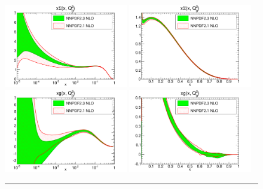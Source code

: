 \begin{figure}[hp!]
\centering
\includegraphics[width=0.48\textwidth]{6-LHCimpact/figs/xSinglet_Q_2_log-21-vs-23-nlo.pdf}
\includegraphics[width=0.48\textwidth]{6-LHCimpact/figs/xSinglet_Q_2_lin-21-vs-23-nlo.pdf}\\
\includegraphics[width=0.48\textwidth]{6-LHCimpact/figs/xg_Q_2_log-21-vs-23-nlo.pdf}
\includegraphics[width=0.48\textwidth]{6-LHCimpact/figs/xg_Q_2_lin-21-vs-23-nlo.pdf}

\noindent\rule[0.5ex]{\linewidth}{1pt}


\end{figure}
